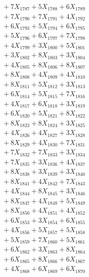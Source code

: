 \documentclass[a4paper,10pt]{article}
\begin{document}
{\begin{align}
&\;  + 7 X_{1787} + 5 X_{1788} + 6 X_{1789} \\[0.3ex]
&\;  + 7 X_{1790} + 7 X_{1791} + 4 X_{1792} \\[0.3ex]
&\;  + 6 X_{1793} + 5 X_{1794} + 6 X_{1795} \\[0.3ex]
&\;  + 5 X_{1796} + 6 X_{1797} + 7 X_{1798} \\[0.3ex]
&\;  + 4 X_{1799} + 3 X_{1800} + 5 X_{1801} \\[0.3ex]
&\;  + 3 X_{1802} + 8 X_{1803} + 3 X_{1804} \\[0.3ex]
&\;  + 4 X_{1805} + 8 X_{1806} + 8 X_{1807} \\[0.3ex]
&\;  + 8 X_{1808} + 4 X_{1809} + 4 X_{1810} \\[0.5ex]\allowbreak
&\;  + 8 X_{1811} + 5 X_{1812} + 3 X_{1813} \\[0.3ex]
&\;  + 6 X_{1814} + 5 X_{1815} + 7 X_{1816} \\[0.3ex]
&\;  + 4 X_{1817} + 6 X_{1818} + 3 X_{1819} \\[0.3ex]
&\;  + 6 X_{1820} + 5 X_{1821} + 8 X_{1822} \\[0.3ex]
&\;  + 8 X_{1823} + 8 X_{1824} + 3 X_{1825} \\[0.3ex]
&\;  + 4 X_{1826} + 4 X_{1827} + 3 X_{1828} \\[0.3ex]
&\;  + 8 X_{1829} + 4 X_{1830} + 7 X_{1831} \\[0.3ex]
&\;  + 7 X_{1832} + 7 X_{1833} + 3 X_{1834} \\[0.3ex]
&\;  + 7 X_{1835} + 3 X_{1836} + 4 X_{1837} \\[0.3ex]
&\;  + 8 X_{1838} + 3 X_{1839} + 3 X_{1840} \\[0.5ex]\allowbreak
&\;  + 8 X_{1841} + 4 X_{1842} + 7 X_{1843} \\[0.3ex]
&\;  + 4 X_{1844} + 8 X_{1845} + 3 X_{1846} \\[0.3ex]
&\;  + 8 X_{1847} + 4 X_{1848} + 5 X_{1849} \\[0.3ex]
&\;  + 8 X_{1850} + 4 X_{1851} + 4 X_{1852} \\[0.3ex]
&\;  + 6 X_{1853} + 3 X_{1854} + 6 X_{1855} \\[0.3ex]
&\;  + 4 X_{1856} + 5 X_{1857} + 5 X_{1858} \\[0.3ex]
&\;  + 5 X_{1859} + 7 X_{1860} + 5 X_{1861} \\[0.3ex]
&\;  + 6 X_{1862} + 3 X_{1863} + 8 X_{1864} \\[0.3ex]
&\;  + 6 X_{1865} + 8 X_{1866} + 6 X_{1867} \\[0.3ex]
&\;  + 4 X_{1868} + 6 X_{1869} + 6 X_{1870} \\[0.5ex]\allowbreak

\end{align}}
\end{document}
